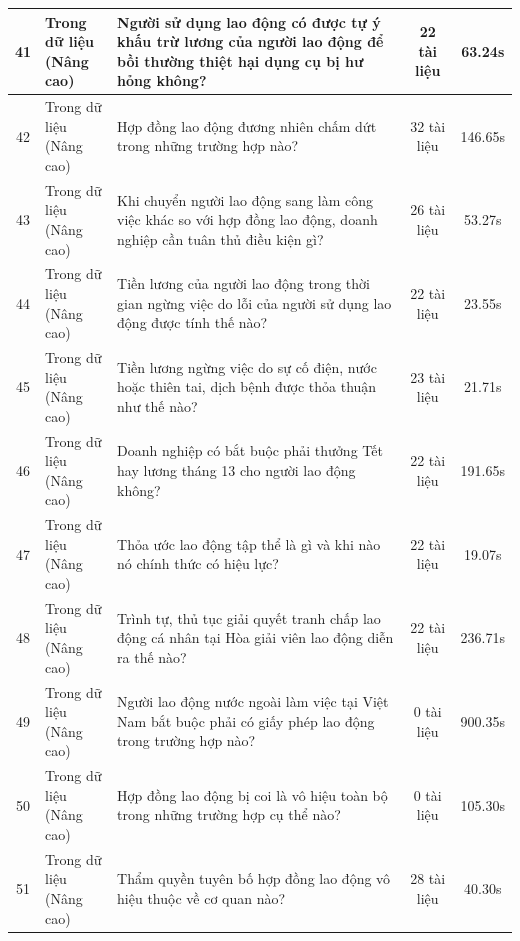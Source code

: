 \begin{longtable}{|c|l|p{6.5cm}|c|c|}
41 & \makecell[l]{Trong dữ liệu\\(Nâng cao)} & Người sử dụng lao động có được tự ý khấu trừ lương của người lao động để bồi thường thiệt hại dụng cụ bị hư hỏng không? & 22 tài liệu & 63.24s \\ \hline
42 & \makecell[l]{Trong dữ liệu\\(Nâng cao)} & Hợp đồng lao động đương nhiên chấm dứt trong những trường hợp nào? & 32 tài liệu & 146.65s \\ \hline
43 & \makecell[l]{Trong dữ liệu\\(Nâng cao)} & Khi chuyển người lao động sang làm công việc khác so với hợp đồng lao động, doanh nghiệp cần tuân thủ điều kiện gì? & 26 tài liệu & 53.27s \\ \hline
44 & \makecell[l]{Trong dữ liệu\\(Nâng cao)} & Tiền lương của người lao động trong thời gian ngừng việc do lỗi của người sử dụng lao động được tính thế nào? & 22 tài liệu & 23.55s \\ \hline
45 & \makecell[l]{Trong dữ liệu\\(Nâng cao)} & Tiền lương ngừng việc do sự cố điện, nước hoặc thiên tai, dịch bệnh được thỏa thuận như thế nào? & 23 tài liệu & 21.71s \\ \hline
46 & \makecell[l]{Trong dữ liệu\\(Nâng cao)} & Doanh nghiệp có bắt buộc phải thưởng Tết hay lương tháng 13 cho người lao động không? & 22 tài liệu & 191.65s \\ \hline
47 & \makecell[l]{Trong dữ liệu\\(Nâng cao)} & Thỏa ước lao động tập thể là gì và khi nào nó chính thức có hiệu lực? & 22 tài liệu & 19.07s \\ \hline
48 & \makecell[l]{Trong dữ liệu\\(Nâng cao)} & Trình tự, thủ tục giải quyết tranh chấp lao động cá nhân tại Hòa giải viên lao động diễn ra thế nào? & 22 tài liệu & 236.71s \\ \hline
49 & \makecell[l]{Trong dữ liệu\\(Nâng cao)} & Người lao động nước ngoài làm việc tại Việt Nam bắt buộc phải có giấy phép lao động trong trường hợp nào? & 0 tài liệu & 900.35s \\ \hline
50 & \makecell[l]{Trong dữ liệu\\(Nâng cao)} & Hợp đồng lao động bị coi là vô hiệu toàn bộ trong những trường hợp cụ thể nào? & 0 tài liệu & 105.30s \\ \hline
51 & \makecell[l]{Trong dữ liệu\\(Nâng cao)} & Thẩm quyền tuyên bố hợp đồng lao động vô hiệu thuộc về cơ quan nào? & 28 tài liệu & 40.30s \\ \hline

\end{longtable}
